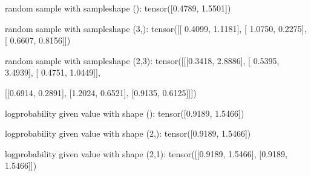 \documentclass[letterpaper,10pt,english]{sphinxmanual}
\begin{document}
\begin{sphinxVerbatim}[commandchars=\\\{\}]
random sample with sample\PYGZus{}shape ():
 tensor([0.4789, 1.5501]) 

random sample with sample\PYGZus{}shape (3,):
 tensor([[ 0.4099, \PYGZhy{}1.1181],
        [ 1.0750, \PYGZhy{}0.2275],
        [ 0.6607,  0.8156]]) 

random sample with sample\PYGZus{}shape (2,3):
 tensor([[[\PYGZhy{}0.3418,  2.8886],
         [ 0.5395,  3.4939],
         [ 0.4751,  1.0449]],

        [[\PYGZhy{}0.6914,  0.2891],
         [\PYGZhy{}1.2024,  0.6521],
         [\PYGZhy{}0.9135,  0.6125]]])
\end{sphinxVerbatim}

\begin{sphinxVerbatim}[commandchars=\\\{\}]
       
      \PYG{p}{[} \PYG{p}{]} 
      \PYG{p}{[}\PYG{p}{[}\PYG{p}{]} \PYG{p}{[}\PYG{p}{]}\PYG{p}{]}
\end{sphinxVerbatim}

\begin{sphinxVerbatim}[commandchars=\\\{\}]
log\PYGZhy{}probability given value with shape ():
 tensor([\PYGZhy{}0.9189, \PYGZhy{}1.5466]) 

log\PYGZhy{}probability given value with shape (2,):
 tensor([\PYGZhy{}0.9189, \PYGZhy{}1.5466]) 

log\PYGZhy{}probability given value with shape (2,1):
 tensor([[\PYGZhy{}0.9189, \PYGZhy{}1.5466],
        [\PYGZhy{}0.9189, \PYGZhy{}1.5466]])
\end{sphinxVerbatim}
\end{document}
